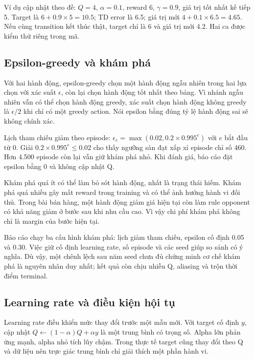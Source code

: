 Ví dụ cập nhật theo đề: \(Q=4\), \(\alpha=0.1\), reward 6,
\(\gamma=0.9\), giá trị tốt nhất kế tiếp 5. Target là
\(6+0.9\times5=10.5\); TD error là 6.5; giá trị mới
\(4+0.1\times6.5=4.65\). Nếu cùng transition kết thúc thật, target chỉ
là 6 và giá trị mới 4.2. Hai ca được kiểm thử riêng trong mã.

\subsection{Epsilon-greedy và khám
phá}\label{epsilon-greedy-vuxe0-khuxe1m-phuxe1}

Với hai hành động, epsilon-greedy chọn một hành động ngẫu nhiên trong
hai lựa chọn với xác suất \(\epsilon\), còn lại chọn hành động tốt nhất
theo bảng. Vì nhánh ngẫu nhiên vẫn có thể chọn hành động greedy, xác
suất chọn hành động không greedy là \(\epsilon/2\) khi chỉ có một greedy
action. Nói epsilon bằng đúng tỷ lệ hành động sai sẽ không chính xác.

Lịch tham chiếu giảm theo episode:
\(\epsilon_e=\max(0.02,0.2\times0.995^e)\) với \(e\) bắt đầu từ 0. Giải
\(0.2\times0.995^e\le0.02\) cho thấy ngưỡng sàn đạt xấp xỉ episode chỉ
số 460. Hơn 4.500 episode còn lại vẫn giữ khám phá nhỏ. Khi đánh giá,
báo cáo đặt epsilon bằng 0 và không cập nhật Q.

Khám phá quá ít có thể làm bỏ sót hành động, nhất là trạng thái hiếm.
Khám phá quá nhiều gây mất reward trong training và có thể ảnh hưởng
hành vi đối thủ. Trong bài bán hàng, một hành động giảm giá hiện tại còn
làm rule opponent có khả năng giảm ở bước sau khi nhu cầu cao. Vì vậy
chi phí khám phá không chỉ là margin của bước hiện tại.

Báo cáo chạy ba cấu hình khám phá: lịch giảm tham chiếu, epsilon cố định
0.05 và 0.30. Việc giữ cố định learning rate, số episode và các seed
giúp so sánh có ý nghĩa. Dù vậy, một chênh lệch sau năm seed chưa đủ
chứng minh cơ chế khám phá là nguyên nhân duy nhất; kết quả còn chịu
nhiễu Q, aliasing và trộn thời điểm terminal.

\subsection{Learning rate và điều kiện hội
tụ}\label{learning-rate-vuxe0-ux111iux1ec1u-kiux1ec7n-hux1ed9i-tux1ee5}

Learning rate điều khiển mức thay đổi trước một mẫu mới. Với target cố
định \(y\), cập nhật \(Q\leftarrow(1-\alpha)Q+\alpha y\) là một trung
bình có trọng số. Alpha lớn phản ứng mạnh, alpha nhỏ tích lũy chậm.
Trong thực tế target cũng thay đổi theo Q và dữ liệu nên trực giác trung
bình chỉ giải thích một phần hành vi.

